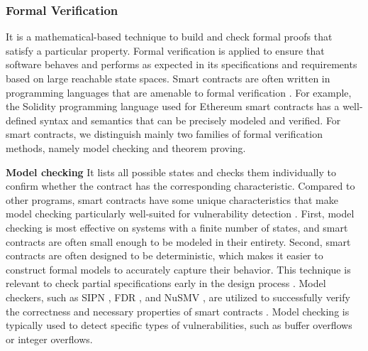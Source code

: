 \documentclass[manuscript,screen]{acmart}
\begin{document}
\subsubsection{Formal Verification}
It is a mathematical-based technique to build and check formal proofs that satisfy a particular property. Formal verification is applied to ensure that software behaves and performs as expected in its specifications and requirements based on large reachable state spaces. Smart contracts are often written in programming languages that are amenable to formal verification \cite{harz2018towards, jiao2020semantic}. For example, the Solidity programming language used for Ethereum smart contracts has a well-defined syntax and semantics that can be precisely modeled and verified. For smart contracts, we distinguish mainly two families of formal verification methods, namely model checking and theorem proving.

\textbf{Model checking} It lists all possible states and checks them individually to confirm whether the contract has the corresponding characteristic. Compared to other programs, smart contracts have some unique characteristics that make model checking particularly well-suited for vulnerability detection \cite{garfatta2021survey, AbdellatifB18, AhrendtBEPPRS19, crincoli2022}. First, model checking is most effective on systems with a finite number of states, and smart contracts are often small enough to be modeled in their entirety. Second, smart contracts are often designed to be deterministic, which makes it easier to construct formal models to accurately capture their behavior. This technique is relevant to check partial specifications early in the design process \cite{NehaiPD18}. Model checkers, such as SIPN \cite{BaiCDH18}, FDR \cite{QuHCWML18}, and NuSMV \cite{NehaiPD18}, are utilized to successfully verify the correctness and necessary properties of smart contracts \cite{QuHCWML18}.  Model checking is typically used to detect specific types of vulnerabilities, such as buffer overflows or integer overflows.
\end{document}
